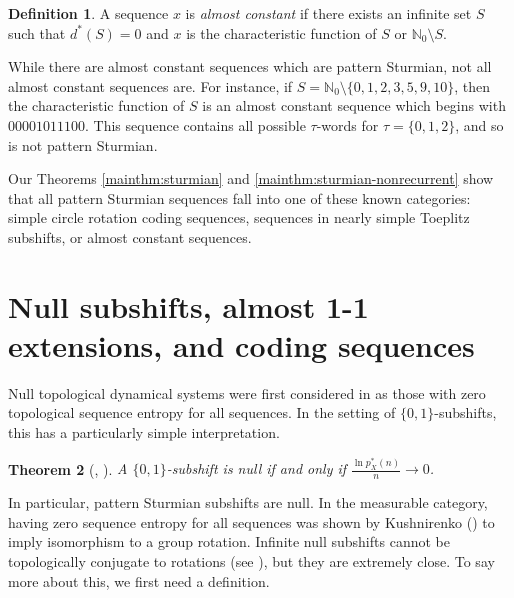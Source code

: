 \documentclass[11pt,reqno]{amsart}
\newtheorem{theorem}{Theorem}[section]
\theoremstyle{definition}
\newtheorem{definition}[theorem]{Definition}
\theoremstyle{plain}
\newcommand{\N}{\mathbb{N}}
\newcommand{\AuthornoteA}[2]{{\sf\small\color{magenta}{[#1: #2]}}}
\newcommand{\AuthornoteR}[2]{{\sf\small\color{blue}{[#1: #2]}}}
\newcommand{\Anote}{\AuthornoteA{A}}
\newcommand{\rp}{\AuthornoteR{R}}
\begin{document}
\begin{definition}
    A sequence $x$ is \emph{almost constant} if there exists an infinite set $S$ such that $d^*(S) = 0$ and $x$ is the characteristic function of $S$ or $\N_0 \setminus S$.
\end{definition}


While there are almost constant sequences which are pattern Sturmian, not all almost constant sequences are. For instance, if $S = \N_0 \setminus \{0, 1, 2, 3, 5, 9, 10\}$, then the characteristic function of $S$ is an almost constant sequence which begins with $00001011100$. This sequence contains all possible $\tau$-words for $\tau = \{0, 1, 2\}$, and so is not pattern Sturmian. 

Our Theorems \ref{mainthm:sturmian} and \ref{mainthm:sturmian-nonrecurrent} show that all pattern Sturmian sequences fall into one of these known categories: simple circle rotation coding sequences, sequences in nearly simple Toeplitz subshifts, or almost constant sequences. 

\section{Null subshifts, almost 1-1 extensions, and coding sequences}

Null topological dynamical systems were first considered in \cite{TNT} as those with zero topological sequence entropy for all sequences. In the setting of $\{0,1\}$-subshifts, this has a particularly simple interpretation. %


\begin{theorem}[{\cite[Corollary 2.2]{Huang_Ye-combinatorial_lemmas}}, 
{\cite[Theorem 5.1]{GMtame}}]
A $\{0,1\}$-subshift is null if and only if $\frac{\ln p^*_X(n)}{n} \rightarrow 0$. 
\end{theorem}

In particular, pattern Sturmian subshifts are null. %
In the measurable category, having zero sequence entropy for all sequences was shown by Kushnirenko (\cite{Kushnirenko}) to imply isomorphism to a group rotation. Infinite null subshifts cannot be topologically conjugate to rotations (see ), but they are extremely close. To say more about this,  we first need a definition.
\end{document}
